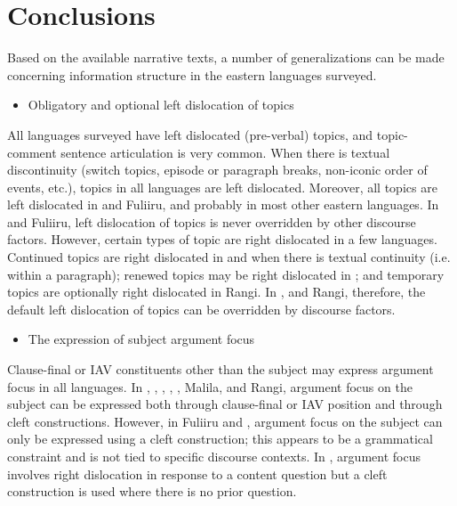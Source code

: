 \documentclass[output=paper]{langsci/langscibook}
\begin{document}
\section{Conclusions}\label{§6:conclusions.nicolle}

Based on the available narrative texts, a number of generalizations can be made concerning information structure in the eastern  languages surveyed.

\begin{itemize}
\item Obligatory and optional left dislocation of topics
\end{itemize}

All languages surveyed have left dislocated (pre-verbal) topics, and topic-comment sentence articulation is very common. When there is textual discontinuity (switch topics, episode or paragraph breaks, non-iconic order of events, etc.), topics in all languages are left dislocated. Moreover, all topics are left dislocated in  and Fuliiru, and probably in most other eastern  languages. In  and Fuliiru, left dislocation of topics is never overridden by other discourse factors. However, certain types of topic are right dislocated in a few languages. Continued topics are right dislocated in  and  when there is textual continuity (i.e. within a paragraph); renewed topics may be right dislocated in ; and temporary topics are optionally right dislocated in Rangi. In ,  and Rangi, therefore, the default left dislocation of topics can be overridden by discourse factors.

\begin{itemize}
\item The expression of subject argument focus
\end{itemize}

Clause-final or IAV constituents other than the subject may express argument focus in all languages. In , , , , , Malila,  and Rangi, argument focus on the subject can be expressed both through clause-final or IAV position and through cleft constructions. However, in Fuliiru and , argument focus on the subject can only be expressed using a cleft construction; this appears to be a grammatical constraint and is not tied to specific discourse contexts. In , argument focus involves right dislocation in response to a content question but a cleft construction is used where there is no prior question.
\end{document}
